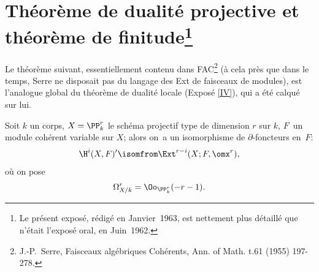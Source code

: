 \renewcommand{\theequation}{\arabic{equation}}

\section[Th\'eor\`eme de dualit\'e projective et th\'eor\`eme de finitude]
{Th\'eor\`eme de dualit\'e projective et th\'eor\`eme de finitude\footnote{Le pr\'esent expos\'e, r\'edig\'e en Janvier~1963, est nettement plus d\'etaill\'e que n'\'etait l'expos\'e oral, en Juin~1962.}}\label{XII.1}

Le th\'eor\`eme suivant, essentiellement contenu dans FAC\footnote{J.-P.~Serre, Faisceaux alg\'ebriques Coh\'erents, Ann. of Math. t.61 (1955) 197-278.} (\`a cela pr\`es que dans le temps, Serre ne disposait pas du langage des Ext de faisceaux de modules), est l'analogue global du th\'eor\`eme de dualit\'e locale (Expos\'e \ref{IV}), qui a \'et\'e calqu\'e sur lui.

\begin{theoreme} \label{XII.1.1}
Soit $k$ un corps, $X=\PP_k^r$ le sch\'ema projectif type de dimension $r$ sur $k$, $F$~un module coh\'erent variable sur $X$; alors on~a un isomorphisme de $\partial$-foncteurs en~$F$:
\steco
\begin{equation} \label{eq:XII.1} {}\H^i(X, F)' \isomfrom \Ext^{r-i}(X;F, \omx^r),
\end{equation}
o\`u on pose
\steco
\begin{equation} \label{eq:XII.2} {}\Omega_{X/k}^r= \Oo_{\PP_k^r}(-r-1).
\end{equation}
\end{theoreme}

